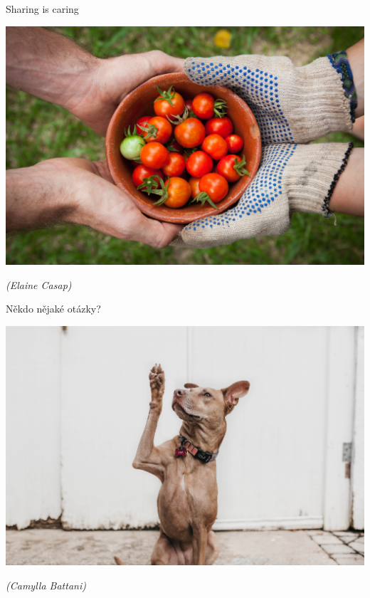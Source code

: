 \documentclass[11pt]{beamer}
\begin{document}
	\begin{frame}{Sharing is caring}
	\begin{center}
		\includegraphics[width=\textwidth]{images/share.jpg}
	\end{center}
	\begin{flushright}
		\textit{(Elaine Casap)}
	\end{flushright}
\end{frame}

	\begin{frame}{Někdo nějaké otázky?}
	\begin{center}
		\includegraphics[width=\textwidth]{images/questions.jpg}
	\end{center}
	\begin{flushright}
		\textit{(Camylla Battani)}
	\end{flushright}
	\end{frame}
\end{document}
